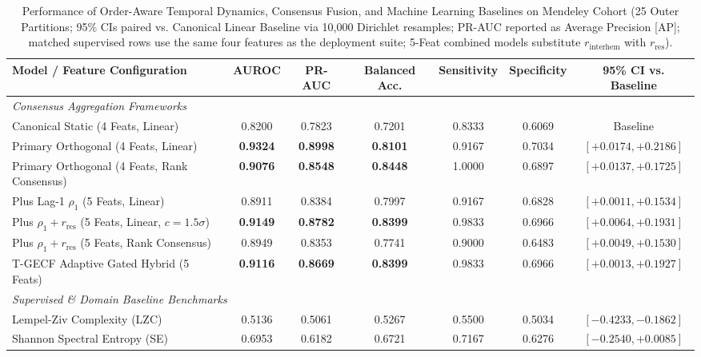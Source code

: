 \begin{table}[t]
\centering
\renewcommand{\arraystretch}{0.91}
\setlength{\tabcolsep}{4.5pt}
\small
\caption{Performance of Order-Aware Temporal Dynamics, Consensus Fusion, and Machine Learning Baselines on Mendeley Cohort (25 Outer Partitions; 95\% CIs paired vs. Canonical Linear Baseline via 10,000 Dirichlet resamples; PR-AUC reported as Average Precision [AP]; matched supervised rows use the same four features as the deployment suite; 5-Feat combined models substitute $r_{\text{interhem}}$ with $r_{\text{res}}$).}
\label{tab:main_results}
\begin{tabular}{lcccccc}
\hline
\textbf{Model / Feature Configuration} & \textbf{AUROC} & \textbf{PR-AUC} & \textbf{Balanced Acc.} & \textbf{Sensitivity} & \textbf{Specificity} & \textbf{95\% CI vs. Baseline} \\
\hline
\multicolumn{7}{l}{\textit{Consensus Aggregation Frameworks}} \\
\hline
\quad Canonical Static (4 Feats, Linear) & 0.8200 & 0.7823 & 0.7201 & 0.8333 & 0.6069 & Baseline \\
\quad Primary Orthogonal (4 Feats, Linear) & \textbf{0.9324} & \textbf{0.8998} & \textbf{0.8101} & 0.9167 & 0.7034 & {$[+0.0174, +0.2186]$} \\
\quad Primary Orthogonal (4 Feats, Rank Consensus) & \textbf{0.9076} & \textbf{0.8548} & \textbf{0.8448} & 1.0000 & 0.6897 & {$[+0.0137, +0.1725]$} \\
\quad Plus Lag-1 $\rho_1$ (5 Feats, Linear) & 0.8911 & 0.8384 & 0.7997 & 0.9167 & 0.6828 & {$[+0.0011, +0.1534]$} \\
\quad Plus $\rho_1 + r_{\text{res}}$ (5 Feats, Linear, $c=1.5\sigma$) & \textbf{0.9149} & \textbf{0.8782} & \textbf{0.8399} & 0.9833 & 0.6966 & {$[+0.0064, +0.1931]$} \\
\quad Plus $\rho_1 + r_{\text{res}}$ (5 Feats, Rank Consensus) & 0.8949 & 0.8353 & 0.7741 & 0.9000 & 0.6483 & {$[+0.0049, +0.1530]$} \\
\quad T-GECF Adaptive Gated Hybrid (5 Feats) & \textbf{0.9116} & \textbf{0.8669} & \textbf{0.8399} & 0.9833 & 0.6966 & {$[+0.0013, +0.1927]$} \\
\hline
\multicolumn{7}{l}{\textit{Supervised \& Domain Baseline Benchmarks}} \\
\hline
\quad Lempel-Ziv Complexity (LZC) & 0.5136 & 0.5061 & 0.5267 & 0.5500 & 0.5034 & {$[-0.4233, -0.1862]$} \\
\quad Shannon Spectral Entropy (SE) & 0.6953 & 0.6182 & 0.6721 & 0.7167 & 0.6276 & {$[-0.2540, +0.0085]$} \\

\end{tabular}
\end{table}

